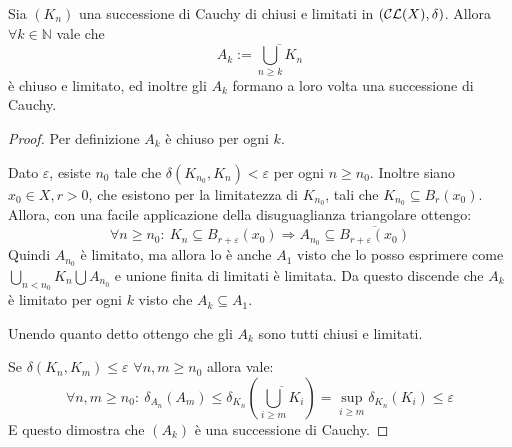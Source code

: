 \begin{lemma} \label{UnioniDiCauchy}
Sia $(K_n)$ una successione di Cauchy di chiusi e limitati in $\left (\mathcal{CL}(X),\delta\right  ) $. 
Allora $\forall k \in \mathbb{N}$ vale che
\begin{equation*}
A_k:=\overline{\bigcup_{n\geq k} K_n}
\end{equation*}
è chiuso e limitato, ed inoltre gli $A_k$ formano a loro volta una successione di Cauchy.
\end{lemma}

\begin{proof}
Per definizione $A_k$ è chiuso per ogni $k$. 

Dato $\varepsilon$, esiste $n_0$ tale che $\delta(K_{n_0}, K_n)< \varepsilon$ per ogni $n\geq n_0$. 
Inoltre siano $x_0\in X,r>0$, che esistono per la limitatezza di $K_{n_0}$, tali che $K_{n_0}\subseteq B_r(x_0)$. 
Allora, con una facile applicazione della disuguaglianza triangolare ottengo:
\begin{equation*}
	\forall n\ge n_0:\ K_n\subseteq B_{r+\varepsilon}(x_0) \Rightarrow A_{n_0}\subseteq \overline{B_{r+\varepsilon}(x_0)}
\end{equation*}
Quindi $A_{n_0}$ è limitato, ma allora lo è anche $A_1$ visto che lo posso esprimere come $\bigcup_{n<n_0}K_n \bigcup A_{n_0}$ e unione finita di limitati è limitata. Da questo discende che $A_k$ è limitato per ogni $k$ visto che $A_k\subseteq A_1$.

Unendo quanto detto ottengo che gli $A_k$ sono tutti chiusi e limitati.

Se $\delta(K_n, K_m)\leq \varepsilon$ $\forall n,m \geq n_0$  allora vale:
\begin{equation*}
	\forall n,m\ge n_0:\ \delta_{A_n}(A_m)\le \delta_{K_n}\left(\overline{\bigcup_{i\ge m}K_i} \right)
	=\sup_{i\ge m} \delta_{K_n}(K_i) \le \varepsilon
\end{equation*}
E questo dimostra che $(A_k)$ è una successione di Cauchy.
\end{proof}

